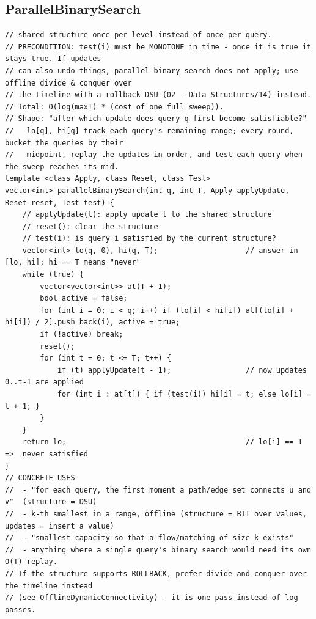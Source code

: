 \documentclass[9pt,a4paper,twocolumn]{extarticle}
\begin{document}
\filbreak
\subsection{ParallelBinarySearch}
\nopagebreak
\begin{lstlisting}
// shared structure once per level instead of once per query.
// PRECONDITION: test(i) must be MONOTONE in time - once it is true it stays true. If updates
// can also undo things, parallel binary search does not apply; use offline divide & conquer over
// the timeline with a rollback DSU (02 - Data Structures/14) instead.
// Total: O(log(maxT) * (cost of one full sweep)).
// Shape: "after which update does query q first become satisfiable?"
//   lo[q], hi[q] track each query's remaining range; every round, bucket the queries by their
//   midpoint, replay the updates in order, and test each query when the sweep reaches its mid.
template <class Apply, class Reset, class Test>
vector<int> parallelBinarySearch(int q, int T, Apply applyUpdate, Reset reset, Test test) {
    // applyUpdate(t): apply update t to the shared structure
    // reset(): clear the structure
    // test(i): is query i satisfied by the current structure?
    vector<int> lo(q, 0), hi(q, T);                    // answer in [lo, hi]; hi == T means "never"
    while (true) {
        vector<vector<int>> at(T + 1);
        bool active = false;
        for (int i = 0; i < q; i++) if (lo[i] < hi[i]) at[(lo[i] + hi[i]) / 2].push_back(i), active = true;
        if (!active) break;
        reset();
        for (int t = 0; t <= T; t++) {
            if (t) applyUpdate(t - 1);                 // now updates 0..t-1 are applied
            for (int i : at[t]) { if (test(i)) hi[i] = t; else lo[i] = t + 1; }
        }
    }
    return lo;                                         // lo[i] == T  =>  never satisfied
}
// CONCRETE USES
//  - "for each query, the first moment a path/edge set connects u and v"  (structure = DSU)
//  - k-th smallest in a range, offline (structure = BIT over values, updates = insert a value)
//  - "smallest capacity so that a flow/matching of size k exists"
//  - anything where a single query's binary search would need its own O(T) replay.
// If the structure supports ROLLBACK, prefer divide-and-conquer over the timeline instead
// (see OfflineDynamicConnectivity) - it is one pass instead of log passes.
\end{lstlisting}
\end{document}

